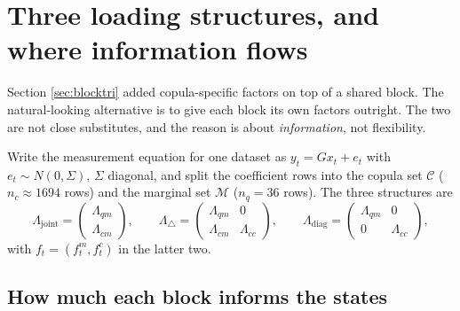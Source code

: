 \documentclass[11pt]{article}
\begin{document}
\section{Three loading structures, and where information flows}
\label{sec:structures}

Section \ref{sec:blocktri} added copula-specific factors on top of a shared
block. The natural-looking alternative is to give each block its own factors
outright. The two are not close substitutes, and the reason is about
\emph{information}, not flexibility.

Write the measurement equation for one dataset as $y_t = G x_t + e_t$ with
$e_t \sim N(0,\Sigma)$, $\Sigma$ diagonal, and split the coefficient rows into
the copula set $\mathcal{C}$ ($n_c \approx 1694$ rows) and the marginal set
$\mathcal{M}$ ($n_q = 36$ rows). The three structures are
\begin{equation}
  \Lambda_{\text{joint}} = \begin{pmatrix} \Lambda_{qm} \\ \Lambda_{cm} \end{pmatrix},
  \qquad
  \Lambda_{\triangle} = \begin{pmatrix} \Lambda_{qm} & 0 \\ \Lambda_{cm} & \Lambda_{cc}\end{pmatrix},
  \qquad
  \Lambda_{\mathrm{diag}} = \begin{pmatrix} \Lambda_{qm} & 0 \\ 0 & \Lambda_{cc}\end{pmatrix},
\end{equation}
with $f_t = (f^m_t, f^c_t)$ in the latter two.

\subsection{How much each block informs the states}
\end{document}
